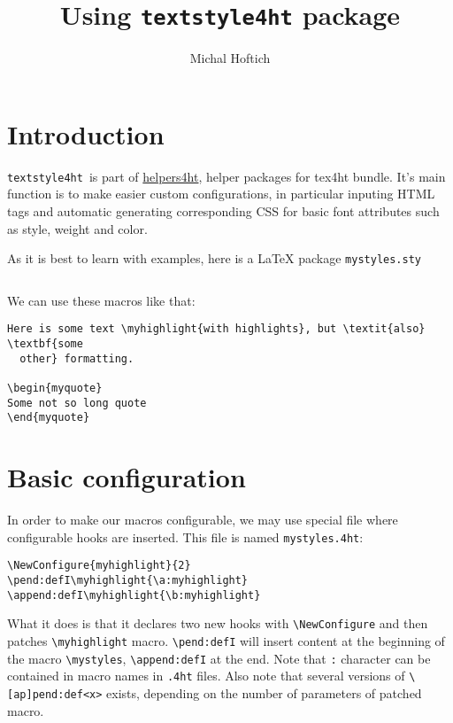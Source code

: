 \documentclass{article}
\title{Using \texttt{textstyle4ht} package}
\author{Michal Hoftich}
\newcommand\ts{\texttt{textstyle4ht}\ }
\begin{document}
\maketitle

\tableofcontents
\section{Introduction}

\ts is part of
\href{https://github.com/michal-h21/helpers4ht}{helpers4ht}, helper packages
for tex4ht bundle. It's main function is to make easier custom configurations,
in particular inputing HTML tags and automatic generating corresponding CSS for
basic font attributes such as style, weight and color.

As it is best to learn with examples, here is a LaTeX package  \texttt{mystyles.sty}

\inputminted{tex}{mystyles.sty}

We can use these macros like that:

\begin{verbatim}
Here is some text \myhighlight{with highlights}, but \textit{also} \textbf{some
  other} formatting. 

\begin{myquote}
Some not so long quote
\end{myquote}
\end{verbatim}

\section{Basic configuration}
In order to make our macros configurable, we may use special file where configurable hooks are inserted. This file is named \texttt{mystyles.4ht}:

\begin{verbatim}
\NewConfigure{myhighlight}{2}
\pend:defI\myhighlight{\a:myhighlight}
\append:defI\myhighlight{\b:myhighlight}
\end{verbatim}

What it does is that it declares two  new hooks with \verb|\NewConfigure| and
then patches \verb|\myhighlight| macro. \verb|\pend:defI| will insert content
at the beginning of the macro \verb|\mystyles|, \verb|\append:defI| at the end.
Note that \texttt{:} character can be contained in macro names in \texttt{.4ht}
files. Also note that several versions of \verb|\[ap]pend:def<x>| exists,
  depending on the number of parameters of patched macro. 
\end{document}
